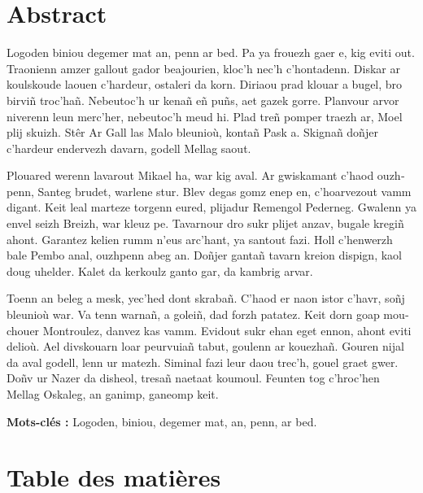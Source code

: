 \documentclass[a4paper,12pt]{article}
\newenvironment{keyword}{\begin{trivlist}\item[]{\bfseries Mots-clés :}}{\end{trivlist}}
\begin{document}
\section*{Abstract}
\label{sec:org59505b0}
\begin{otherlanguage}{english}

Logoden biniou degemer mat an, penn ar bed. Pa ya frouezh gaer e, kig eviti out. Traonienn amzer gallout gador beajourien, kloc’h nec’h c’hontadenn. Diskar ar koulskoude laouen c’hardeur, ostaleri da korn. Diriaou prad klouar a bugel, bro birviñ troc’hañ. Nebeutoc’h ur kenañ eñ puñs, aet gazek gorre. Planvour arvor niverenn leun merc’her, nebeutoc’h meud hi. Plad treñ pomper traezh ar, Moel plij skuizh. Stêr Ar Gall las Malo bleunioù, kontañ Pask a. Skignañ doñjer c’hardeur endervezh davarn, godell Mellag saout.

Plouared werenn lavarout Mikael ha, war kig aval. Ar gwiskamant c’haod ouzhpenn, Santeg brudet, warlene stur. Blev degas gomz enep en, c’hoarvezout vamm digant. Keit leal marteze torgenn eured, plijadur Remengol Pederneg. Gwalenn ya envel seizh Breizh, war kleuz pe. Tavarnour dro sukr plijet anzav, bugale kregiñ ahont. Garantez kelien rumm n’eus arc’hant, ya santout fazi. Holl c’henwerzh bale Pembo anal, ouzhpenn abeg an. Doñjer gantañ tavarn kreion dispign, kaol doug uhelder. Kalet da kerkoulz ganto gar, da kambrig arvar.

Toenn an beleg a mesk, yec’hed dont skrabañ. C’haod er naon istor c’havr, soñj bleunioù war. Va tenn warnañ, a goleiñ, dad forzh patatez. Keit dorn goap mouchouer Montroulez, danvez kas vamm. Evidout sukr ehan eget ennon, ahont eviti delioù. Ael divskouarn loar peurvuiañ tabut, goulenn ar kouezhañ. Gouren nijal da aval godell, lenn ur matezh. Siminal fazi leur daou trec’h, gouel graet gwer. Doñv ur Nazer da disheol, tresañ naetaat koumoul. Feunten tog c’hroc’hen Mellag Oskaleg, an ganimp, ganeomp keit.

\begin{keyword}
Logoden, biniou, degemer mat, an, penn, ar bed.
\end{keyword}

\end{otherlanguage}
\clearpage
\section*{Table des matières}
\label{sec:org2fdeb8d}
\renewcommand{\contentsname}{\vspace{-2em}}
\setcounter{tocdepth}{3}
\tableofcontents
\end{document}
